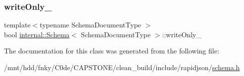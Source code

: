 \mbox{\label{classinternal_1_1Schema_aff30879c91a7bb2c8913db4cec568023}} 
\subsubsection{\texorpdfstring{write\+Only\+\_\+}{writeOnly\_}}
{\footnotesize\ttfamily template$<$typename Schema\+Document\+Type $>$ \\
bool \hyperlink{classinternal_1_1Schema}{internal\+::\+Schema}$<$ Schema\+Document\+Type $>$\+::write\+Only\+\_\+\hspace{0.3cm}{\ttfamily [private]}}



The documentation for this class was generated from the following file\+:\begin{DoxyCompactItemize}
\item 
/mnt/hdd/fnky/\+C0de/\+C\+A\+P\+S\+T\+O\+N\+E/clean\+\_\+build/include/rapidjson/\hyperlink{schema_8h}{schema.\+h}\end{DoxyCompactItemize}
